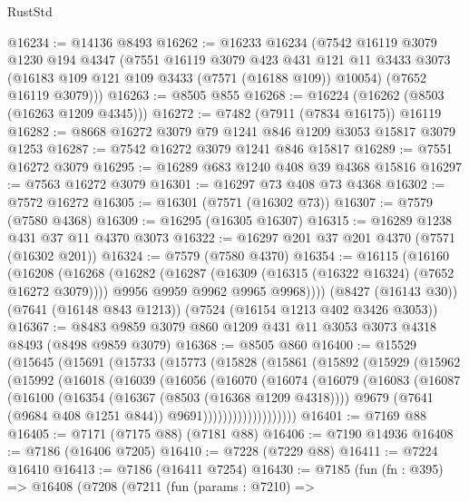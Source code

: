 \begin{lexlean}{RustStd}
\begin{coremodule}
{\begin{coremodule}
{{{{{{{{{{{{{{{{{{{{{{{{{{{{{{{{@16234 := @14136 @8493
@16262 := @16233
    @16234
    (@7542
      @16119
      @3079
      @1230
      @194
      @4347
      (@7551
        @16119
        @3079
        @423
        @431
        @121
        @11
        @3433
        @3073
        (@16183 @109 @121 @109 @3433 (@7571 (@16188 @109)) @10054)
        (@7652 @16119 @3079)))
@16263 := @8505 @855
@16268 := @16224 (@16262 (@8503 (@16263 @1209 @4345)))
@16272 := @7482 (@7911 (@7834 @16175)) @16119
@16282 := @8668 @16272 @3079 @79 @1241 @846 @1209 @3053 @15817 @3079 @1253
@16287 := @7542 @16272 @3079 @1241 @846 @15817
@16289 := @7551 @16272 @3079
@16295 := @16289 @683 @1240 @408 @39 @4368 @15816
@16297 := @7563 @16272 @3079
@16301 := @16297 @73 @408 @73 @4368
@16302 := @7572 @16272
@16305 := @16301 (@7571 (@16302 @73))
@16307 := @7579 (@7580 @4368)
@16309 := @16295 (@16305 @16307)
@16315 := @16289 @1238 @431 @37 @11 @4370 @3073
@16322 := @16297 @201 @37 @201 @4370 (@7571 (@16302 @201))
@16324 := @7579 (@7580 @4370)
@16354 := @16115
    (@16160
      (@16208
        (@16268
          (@16282
            (@16287 (@16309 (@16315 (@16322 @16324) (@7652 @16272 @3079))))
            @9956
            @9959
            @9962
            @9965
            @9968))))
    (@8427 (@16143 @30))
    (@7641 (@16148 @843 @1213))
    (@7524 (@16154 @1213 @402 @3426 @3053))
@16367 := @8483 @9859 @3079 @860 @1209 @431 @11 @3053 @3073 @4318 @8493 (@8498 @9859 @3079)
@16368 := @8505 @860
@16400 := @15529
    (@15645
      (@15691
        (@15733
          (@15773
            (@15828
              (@15861
                (@15892
                  (@15929
                    (@15962
                      (@15992
                        (@16018
                          (@16039
                            (@16056
                              (@16070
                                (@16074
                                  (@16079
                                    (@16083
                                      (@16087
                                        (@16100
                                          (@16354 (@16367 (@8503 (@16368 @1209 @4318))))
                                          @9679
                                          (@7641 (@9684 @408 @1251 @844))
                                          @9691)))))))))))))))))))
@16401 := @7169 @88
@16405 := @7171 (@7175 @88) (@7181 @88)
@16406 := @7190 @14936
@16408 := @7186 (@16406 @7205)
@16410 := @7228 (@7229 @88)
@16411 := @7224 @16410
@16413 := @7186 (@16411 @7254)
@16430 := @7185
    (fun (fn : @395) =>
    @16408
      (@7208
        (@7211
          (fun (params : @7210) =>
}}}}}}}}}}}}}}}}}}}}}}}}}}}}}}}}
\end{coremodule}}
\end{coremodule}
\end{lexlean}
